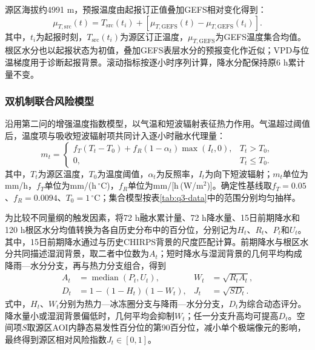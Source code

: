源区海拔约4991 m，预报温度由起报订正值叠加GEFS相对变化得到：
\begin{equation}
 \mu_{T,\mathrm{src}}(t)=T_{\mathrm{src}}(t_i)
       +\left[\mu_{T,\mathrm{GEFS}}(t)-\mu_{T,\mathrm{GEFS}}(t_i)\right].
 \label{eq:q3-anchor}
\end{equation}
其中，$t_i$为起报时刻，$T_{\mathrm{src}}(t_i)$为源区订正温度，$\mu_{T,\mathrm{GEFS}}$为GEFS温度集合均值。根区水分也以起报状态为初值，叠加GEFS表层水分的预报变化作近似；VPD与位温梯度用于诊断起报背景。滚动指标按逐小时序列计算，降水分配保持原6 h累计量不变。


\subsubsection{双机制联合风险模型}
沿用第二问的增强温度指数模型，以气温和短波辐射表征热力作用。气温超过阈值后，温度项与吸收短波辐射项共同计入逐小时融水代理量：
\begin{equation}
 m_t=\begin{cases}
 f_T(T_t-T_0)+f_R(1-\alpha_t)\max(I_t,0), & T_t>T_0,\\
 0, & T_t\leq T_0.
 \end{cases}
 \label{eq:q3-eti}
\end{equation}
其中，$T_t$为源区温度，$T_0$为温度阈值，$\alpha_t$为反照率，$I_t$为向下短波辐射；$m_t$单位为mm/h，$f_T$单位为mm/(h\,$^\circ$C)，$f_R$单位为mm/[h\,(W/m$^2$)]。确定性基线取$f_T=0.05$、$f_R=0.0094$、$T_0=1\,{}^\circ$C；集合模型按表\ref{tab:q3-data}中的范围分别均匀抽样。

为比较不同量纲的触发因素，将72 h融水累计量、72 h降水量、15日前期降水和120 h根区水分均值转换为各自历史分布中的百分位，分别记为$H_t$、$R_t$、$P_t$和$U_t$。其中，15日前期降水通过与历史CHIRPS背景的尺度匹配计算。前期降水与根区水分共同描述湿润背景，取二者中位数为$A_t$；短时降水与湿润背景的几何平均构成降雨—水分分支，再与热力分支组合，得到
\begin{equation}
 \begin{aligned}
 A_t&=\operatorname{median}(P_t,U_t), &
 W_t&=\sqrt{R_tA_t},\\
 D_t&=1-(1-H_t)(1-W_t), &
 J_t&=\sqrt{S D_t}.
 \end{aligned}
 \label{eq:q3-risk}
\end{equation}
式中，$H_t$、$W_t$分别为热力—冰冻圈分支与降雨—水分分支，$D_t$为综合动态评分。降水量小或湿润背景偏低时，几何平均会抑制$W_t$；任一分支升高均可提高$D_t$。空间项$S$取源区AOI内静态易发性百分位的第90百分位，减小单个极端像元的影响，最终得到源区相对风险指数$J_t\in[0,1]$。


